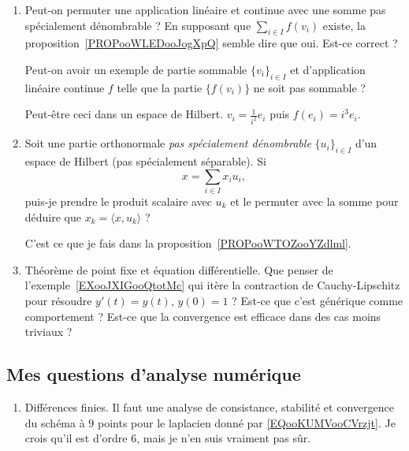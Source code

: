 \begin{enumerate}
    \item
        Peut-on permuter une application linéaire et continue avec une somme pas spécialement dénombrable ? En supposant que \( \sum_{i\in I}f(v_i)\) existe, la proposition~\ref{PROPooWLEDooJogXpQ} semble dire que oui. Est-ce correct ?

        Peut-on avoir un exemple de partie sommable \( \{ v_i \}_{i\in I}\) et d'application linéaire continue \( f\) telle que la partie \( \{ f(v_i) \}\) ne soit pas sommable ?

        Peut-être ceci dans un espace de Hilbert.  \( v_i=\frac{1}{ i^2 }e_i\) puis \( f(e_i)=i^3e_i\).

    \item
        Soit une partie orthonormale \emph{pas spécialement dénombrable} \( \{ u_i \}_{i\in I}\) d'un espace de Hilbert (pas spécialement séparable). Si
        \begin{equation}
            x=\sum_{i\in I}x_iu_i,
        \end{equation}
        puis-je prendre le produit scalaire avec \( u_{k}\) et le permuter avec la somme pour déduire que \( x_k=\langle x, u_k\rangle \) ?

        C'est ce que je fais dans la proposition~\ref{PROPooWTOZooYZdlml}.
    \item
        Théorème de point fixe et équation différentielle. Que penser de l'exemple~\ref{EXooJXIGooQtotMc} qui itère la contraction de Cauchy-Lipschitz pour résoudre \( y'(t)=y(t)\), \( y(0)=1\) ? Est-ce que c'est générique comme comportement ? Est-ce que la convergence est efficace dans des cas moins triviaux ?
\end{enumerate}

\subsection{Mes questions d'analyse numérique}

\begin{enumerate}
    \item
        Différences finies. Il faut une analyse de consistance, stabilité et convergence du schéma à \( 9\) points pour le laplacien donné par \eqref{EQooKUMVooCVrzjt}. Je crois qu'il est d'ordre \( 6\), mais je n'en suis vraiment pas sûr.
\end{enumerate}

